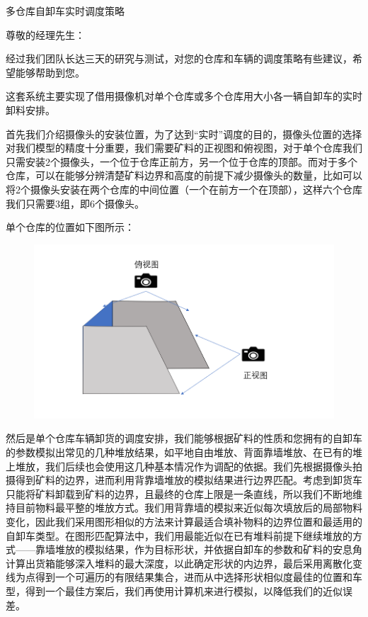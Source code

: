 \documentclass{my_paper}
\begin{document}
\newpage
\begin{center}
    \fontsize{15.75pt}{0}\heiti 多仓库自卸车实时调度策略
\end{center}
尊敬的经理先生：

经过我们团队长达三天的研究与测试，对您的仓库和车辆的调度策略有些建议，希望能够帮助到您。

这套系统主要实现了借用摄像机对单个仓库或多个仓库用大小各一辆自卸车的实时卸料安排。

首先我们介绍摄像头的安装位置，为了达到“实时”调度的目的，摄像头位置的选择对我们模型的精度十分重要，我们需要矿料的正视图和俯视图，对于单个仓库我们只需安装2个摄像头，一个位于仓库正前方，另一个位于仓库的顶部。而对于多个仓库，可以在能够分辨清楚矿料边界和高度的前提下减少摄像头的数量，比如可以将2个摄像头安装在两个仓库的中间位置（一个在前方一个在顶部），这样六个仓库我们只需要3组，即6个摄像头。

单个仓库的位置如下图所示：

\begin {figure}[h]
\centering %
\includegraphics[width=\textwidth]{camera_lay.png}
\end {figure}
 
然后是单个仓库车辆卸货的调度安排，我们能够根据矿料的性质和您拥有的自卸车的参数模拟出常见的几种堆放结果，如平地自由堆放、背面靠墙堆放、在已有的堆上堆放，我们后续也会使用这几种基本情况作为调配的依据。我们先根据摄像头拍摄得到矿料的边界，进而利用背靠墙堆放的模拟结果进行边界匹配。考虑到卸货车只能将矿料卸载到矿料的边界，且最终的仓库上限是一条直线，所以我们不断地维持目前物料最平整的堆放方式。我们用背靠墙的模拟来近似每次填放后的局部物料变化，因此我们采用图形相似的方法来计算最适合填补物料的边界位置和最适用的自卸车类型。在图形匹配算法中，我们用最能近似在已有堆料前提下继续堆放的方式——靠墙堆放的模拟结果，作为目标形状，并依据自卸车的参数和矿料的安息角计算出货箱能够深入堆料的最大深度，以此确定形状的内边界，最后采用离散化变线为点得到一个可遍历的有限结果集合，进而从中选择形状相似度最佳的位置和车型，得到一个最佳方案后，我们再使用计算机来进行模拟，以降低我们的近似误差。
\end{document}
